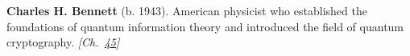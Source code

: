 \textbf{Charles H. Bennett} (b. 1943). American physicist who established the foundations of quantum information theory and introduced the field of quantum cryptography. \emph{[Ch.~\hyperref[ch:maxwelldemon]{45}]}

